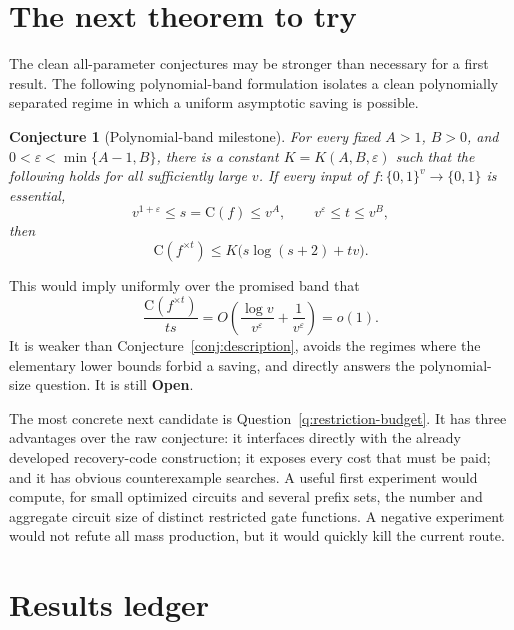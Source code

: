 \documentclass[11pt]{article}
\newtheorem{conjecture}[theorem]{Conjecture}
\theoremstyle{definition}
\newcommand{\bits}{\{0,1\}}
\newcommand{\C}{\mathrm{C}}
\newcommand{\open}{\textcolor{BrickRed}{\textbf{Open}}}
\begin{document}
\section{The next theorem to try}
\label{sec:next}

The clean all-parameter conjectures may be stronger than necessary for a
first result.  The following polynomial-band formulation isolates a clean
polynomially separated regime in which a uniform asymptotic saving is
possible.

\begin{conjecture}[Polynomial-band milestone]
\label{conj:polynomial-band}
For every fixed $A>1$, $B>0$, and
$0<\varepsilon<\min\{A-1,B\}$, there is a constant
$K=K(A,B,\varepsilon)$ such that the following holds for all sufficiently
large $v$.  If every input of $f:\bits^v\to\bits$ is essential,
\[
 v^{1+\varepsilon}\le s=\C(f)\le v^A,
 \qquad
 v^\varepsilon\le t\le v^B,
\]
then
\[
 \C(f^{\times t})
 \le K\bigl(s\log(s+2)+tv\bigr).
\]
\end{conjecture}

This would imply uniformly over the promised band that
\[
 \frac{\C(f^{\times t})}{ts}
 =O\!\left(\frac{\log v}{v^\varepsilon}+\frac1{v^\varepsilon}\right)
 =o(1).
\]
It is weaker than Conjecture~\ref{conj:description}, avoids the regimes where
the elementary lower bounds forbid a saving, and directly answers the
polynomial-size question.  It is still \open.

The most concrete next candidate is Question~\ref{q:restriction-budget}.
It has three advantages over the raw conjecture: it interfaces directly with
the already developed recovery-code construction; it exposes every cost that
must be paid; and it has obvious counterexample searches.  A useful first
experiment would compute, for small optimized circuits and several prefix
sets, the number and aggregate circuit size of distinct restricted gate
functions.  A negative experiment would not refute all mass production, but
it would quickly kill the current route.

\section{Results ledger}
\end{document}
